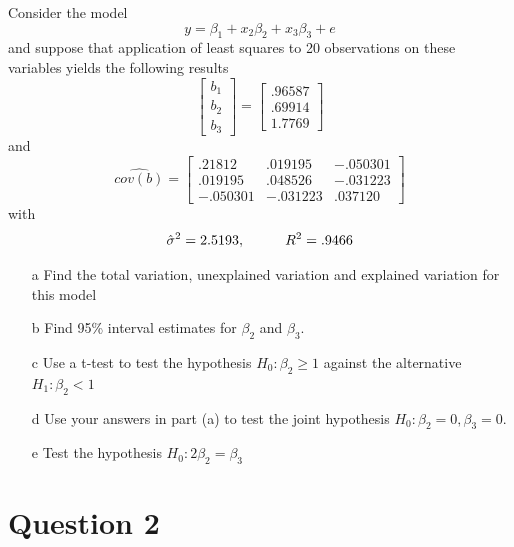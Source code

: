 \documentclass[xcolor={dvipsnames}]{beamer}
\begin{document}
	\begin{frame}[allowframebreaks]{6.3}
	Consider the model $$y = \beta_1 + x_2 \beta_2 + x_3 \beta_3 + e$$ and suppose that application of least squares to 20 observations on these variables yields the following results $$\begin{bmatrix}
		b_1 \\
		b_2 \\
		b_3
	\end{bmatrix}  = \begin{bmatrix} .96587 \\ .69914 \\ 1.7769 \end{bmatrix}$$ and $$\widehat{cov(b)} = \begin{bmatrix} .21812 & .019195 & -.050301 \\ .019195 & .048526 & -.031223 \\ -.050301 & -.031223  & .037120 \end{bmatrix} $$ with $$\hat{\sigma}^2 = 2.5193, \hspace*{1cm} R^2 = .9466$$
	
	\begin{itemize}
		\item[a] Find the total variation, unexplained variation and explained variation for this model
		
		
		\item[b] Find 95\% interval estimates for $\beta_2$ and $\beta_3$.
		
		\item[c] Use a t-test to test the hypothesis $H_0: \beta_2 \ge 1$ against the alternative $H_1: \beta_2 < 1$
		
		
		\item[d] Use your answers in part (a) to test the joint hypothesis $H_0: \beta_2 = 0, \beta_3 = 0$.
		
		\item[e] Test the hypothesis $H_0: 2 \beta_2 = \beta_3$  
		
	\end{itemize}
	
\end{frame}
	
	
	\section{Question 2}
	
\end{document}
